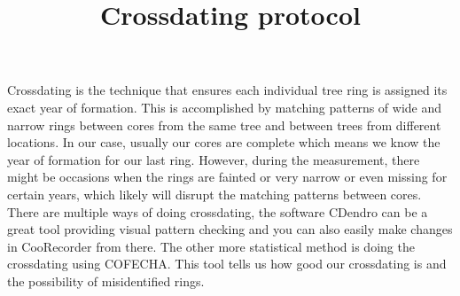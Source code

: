 \documentclass[11pt,letter]{article}
\begin{document}
\title{Crossdating protocol} 

\setlength{\parindent}{0pt}
\setlength{\parskip}{3pt}
Crossdating is the technique that ensures each individual tree ring is assigned its exact year of formation. This is accomplished by matching patterns of wide and narrow rings between cores from the same tree and between trees from different locations. In our case, usually our cores are complete which means we know the year of formation for our last ring. However, during the measurement, there might be occasions when the rings are fainted or very narrow or even missing for certain years, which likely will disrupt the matching patterns between cores. There are multiple ways of doing crossdating, the software CDendro can be a great tool providing visual pattern checking and you can also easily make changes in CooRecorder from there. The other more statistical method is doing the crossdating using COFECHA. This tool tells us how good our crossdating is and the possibility of misidentified rings.
\end{document}

